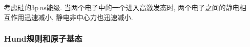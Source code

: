 \documentclass[hidelinks]{ctexart}
\begin{document}

\label{ssub:ls耦合与jj耦合比较}

\begin{ex}
    考虑硅的${3\mathrm{p}\,n\mathrm{s}}$能级. 当两个电子中的一个进入高激发态时, 两个电子之间的静电相互作用迅速减小, 静电非中心力也迅速减小.
\end{ex}


\subsubsection{Hund规则和原子基态} %
\label{ssub:hund规则和原子基态}
\end{document}
